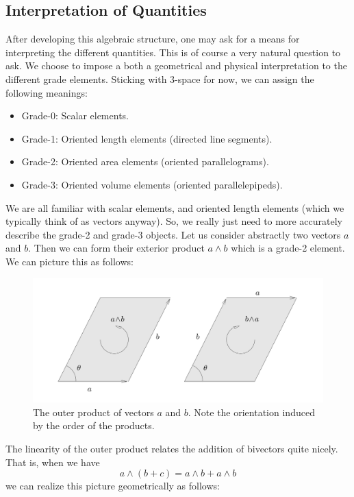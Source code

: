 \subsection{Interpretation of Quantities}
After developing this algebraic structure, one may ask for a means for interpreting the different quantities.  This is of course a very natural question to ask.  We choose to impose a both a geometrical and physical interpretation to the different grade elements. Sticking with 3-space for now, we can assign the following meanings:
\begin{itemize}
    \item Grade-0: Scalar elements.
    \item Grade-1: Oriented length elements (directed line segments).
    \item Grade-2: Oriented area elements (oriented parallelograms).
    \item Grade-3: Oriented volume elements (oriented parallelepipeds).  
\end{itemize}
We are all familiar with scalar elements, and oriented length elements (which we typically think of as vectors anyway).  So, we really just need to more accurately describe the grade-2 and grade-3 objects.  Let us consider abstractly two vectors $a$ and $b$. Then we can form their exterior product $a\wedge b$ which is a grade-2 element.  We can picture this as follows:
\begin{figure}[H]
    \centering
    \includegraphics[width=\textwidth]{geometric_algebra_calculus/figures/ab_outer_prod.png}
    \caption{The outer product of vectors $a$ and $b$. Note the orientation induced by the order of the products.}
    \label{fig:bivector}
\end{figure}
The linearity of the outer product relates the addition of bivectors quite nicely.  That is, when we have
\[
a \wedge (b+c) = a\wedge b + a \wedge b
\]
we can realize this picture geometrically as follows:
